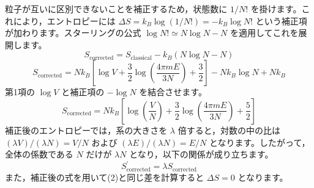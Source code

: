 \begin{solutionparts}
粒子が互いに区別できないことを補正するため，状態数に $1/N!$ を掛けます。これにより，エントロピーには $\Delta S = k_B \log (1/N!) = -k_B \log N!$ という補正項が加わります。スターリングの公式 $\log N! \simeq N \log N - N$ を適用してこれを展開します。
\begin{equation*}
S_{\mathrm{corrected}} = S_{\mathrm{classical}} - k_B (N \log N - N)
\end{equation*}
\begin{equation*}
S_{\mathrm{corrected}} = N k_B \left[ \log V + \frac{3}{2} \log \left( \frac{4\pi m E}{3N} \right) + \frac{3}{2} \right] - N k_B \log N + N k_B
\end{equation*}
第1項の $\log V$ と補正項の $-\log N$ を結合させます。
\begin{equation*}
S_{\mathrm{corrected}} = N k_B \left[ \log \left( \frac{V}{N} \right) + \frac{3}{2} \log \left( \frac{4\pi m E}{3N} \right) + \frac{5}{2} \right]
\end{equation*}
補正後のエントロピーでは，系の大きさを $\lambda$ 倍すると，対数の中の比は $(\lambda V)/(\lambda N) = V/N$ および $(\lambda E)/(\lambda N) = E/N$ となります。したがって，全体の係数である $N$ だけが $\lambda N$ となり，以下の関係が成り立ちます。
\begin{equation*}
S_{\mathrm{corrected}}^\prime = \lambda S_{\mathrm{corrected}}
\end{equation*}
また，補正後の式を用いて(2)と同じ差を計算すると $\Delta S=0$ となります。

\end{solutionparts}
